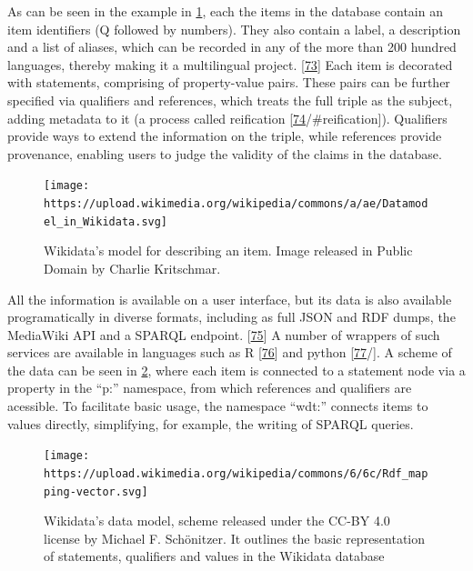 As can be seen in the example in \ref{fig:douglas_adams}, each the items in the database contain an item identifiers (Q followed by numbers).
They also contain a label, a description and a list of aliases, which can be recorded in any of the more than 200 hundred languages, thereby making it a multilingual project. {[}\protect\hyperlink{ref-S1Lksw7i}{73}{]}
Each item is decorated with statements, comprising of property-value pairs.
These pairs can be further specified via qualifiers and references, which treats the full triple as the subject, adding metadata to it (a process called reification {[}\protect\hyperlink{ref-ZhP1mKyl}{74}/\#reification{]}).
Qualifiers provide ways to extend the information on the triple, while references provide provenance, enabling users to judge the validity of the claims in the database.

\begin{figure}
\hypertarget{fig:douglas_adams}{%
\centering
\texttt{[image: https://upload.wikimedia.org/wikipedia/commons/a/ae/Datamodel\_in\_Wikidata.svg]}
\caption{Wikidata's model for describing an item. Image released in Public Domain by Charlie Kritschmar.}\label{fig:douglas_adams}
}
\end{figure}

All the information is available on a user interface, but its data is also available programatically in diverse formats, including as full JSON and RDF dumps, the MediaWiki API and a SPARQL endpoint. {[}\protect\hyperlink{ref-4wSLyAPr}{75}{]}
A number of wrappers of such services are available in languages such as R {[}\protect\hyperlink{ref-1HghnypzG}{76}{]} and python {[}\protect\hyperlink{ref-VKWfrtR1}{77}/{]}.
A scheme of the data can be seen in \ref{fig:datamodel}, where each item is connected to a statement node via a property in the ``p:'' namespace, from which references and qualifiers are acessible.
To facilitate basic usage, the namespace ``wdt:'' connects items to values directly, simplifying, for example, the writing of SPARQL queries.

\begin{figure}
\hypertarget{fig:datamodel}{%
\centering
\texttt{[image: https://upload.wikimedia.org/wikipedia/commons/6/6c/Rdf\_mapping-vector.svg]}
\caption{Wikidata's data model, scheme released under the CC-BY 4.0 license by Michael F. Schönitzer. It outlines the basic representation of statements, qualifiers and values in the Wikidata database}\label{fig:datamodel}
}
\end{figure}

